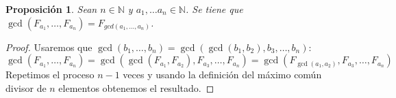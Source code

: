 \documentclass{article}
\theoremstyle{theorem-style}  %
\newtheorem{proposition}{Proposición}
\theoremstyle{definition}
\theoremstyle{example-style}
\begin{document}
    \begin{proposition}
        Sean $n \in \mathbb{N}$ y $a_1, \dots a_n \in \mathbb{N}$. Se tiene que 
        $\gcd(F_{a_1}, \dots, F_{a_n}) = F_{gcd(a_1, \dots, a_n)}$. 
    \end{proposition}
    \begin{proof}
        Usaremos que $\gcd(b_1, \dots, b_n) = \gcd( \gcd(b_1, b_2), b_3, \dots, b_n)$:
        $$ \gcd(F_{a_1}, \dots, F_{a_n}) = \gcd(\gcd(F_{a_1},F_{a_2}), F_{a_3}, \dots, F_{a_n}) = \gcd(F_{\gcd(a_1, a_2)}, F_{a_3}, \dots, F_{a_n}) $$
        Repetimos el proceso $n-1$ veces y usando la definición del máximo común divisor de $n$ elementos obtenemos el resultado.
    \end{proof}
    
    
\end{document}
